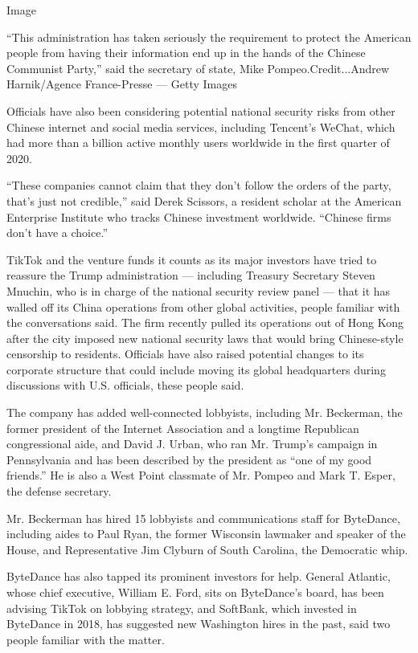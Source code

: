 Image

``This administration has taken seriously the requirement to protect the
American people from having their information end up in the hands of the
Chinese Communist Party,'' said the secretary of state, Mike
Pompeo.Credit...Andrew Harnik/Agence France-Presse --- Getty Images

Officials have also been considering potential national security risks
from other Chinese internet and social media services, including
Tencent's WeChat, which had more than a billion active monthly users
worldwide in the first quarter of 2020.

``These companies cannot claim that they don't follow the orders of the
party, that's just not credible,'' said Derek Scissors, a resident
scholar at the American Enterprise Institute who tracks Chinese
investment worldwide. ``Chinese firms don't have a choice.''

TikTok and the venture funds it counts as its major investors have tried
to reassure the Trump administration --- including Treasury Secretary
Steven Mnuchin, who is in charge of the national security review panel
--- that it has walled off its China operations from other global
activities, people familiar with the conversations said. The firm
recently pulled its operations out of Hong Kong after the city imposed
new national security laws that would bring Chinese-style censorship to
residents. Officials have also raised potential changes to its corporate
structure that could include moving its global headquarters during
discussions with U.S. officials, these people said.

The company has added well-connected lobbyists, including Mr. Beckerman,
the former president of the Internet Association and a longtime
Republican congressional aide, and David J. Urban, who ran Mr. Trump's
campaign in Pennsylvania and has been described by the president as
``one of my good friends.'' He is also a West Point classmate of Mr.
Pompeo and Mark T. Esper, the defense secretary.

Mr. Beckerman has hired 15 lobbyists and communications staff for
ByteDance, including aides to Paul Ryan, the former Wisconsin lawmaker
and speaker of the House, and Representative Jim Clyburn of South
Carolina, the Democratic whip.

ByteDance has also tapped its prominent investors for help. General
Atlantic, whose chief executive, William E. Ford, sits on ByteDance's
board, has been advising TikTok on lobbying strategy, and SoftBank,
which invested in ByteDance in 2018, has suggested new Washington hires
in the past, said two people familiar with the matter.

